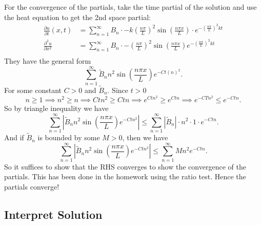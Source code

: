 \documentclass[class=article,crop=false]{standalone}
\begin{document}
For the convergence of the partials, take the time partial of the solution and use the heat equation to get the 2nd space partial:
\begin{align*}
	\frac{\partial u}{\partial t} (x,t) &= \sum_{ n= 1}^{\infty} B_n \cdot -k \left( \frac{n \pi }{L} \right)^2 \sin \left( \frac{ n\pi x}{ L} \right) \cdot  e^{-( \frac{ n\pi}{L} )^2 kt}   \\
	\frac{\partial^2 u}{\partial { x}^2} &= \sum_{ n= 1}^{\infty} B_n \cdot -\left( \frac{n \pi}{L} \right)^2 \sin \left( \frac{ n\pi x}{ L} \right) e^{-( \frac{ n\pi}{L} )^2 kt}   \\
\end{align*}
They have the general form
\[
	\sum_{ n= 1}^{\infty} \tilde{B}_n n^2 \sin \left( \frac{ n\pi x}{ L} \right) e^{-C t( n )^2 } 
.\]
For some constant $ C>0$ and $ \tilde{ B}_n$. Since  $ t>0$
 \[
n\geq 1 \implies n^2 \geq n \implies Ctn^2 \geq Ct n \implies e^{Ctn^2} \geq e^{Ctn} \implies e^{-CTn^2} \leq e^{-Ctn}
.\] 
So by triangle inequality we have
\[
\sum_{ n= 1}^{\infty} \left| \tilde{ B}_n n^2 \sin \left( \frac{ n\pi x}{ L} \right) e^{-Ctn^2}  \right| \leq \sum_{ n= 1}^{\infty} |\tilde{ B}_n | \cdot  n^2 \cdot 1 \cdot  e^{-Ctn}
.\] 
And if $ \tilde{ B}_n $ is bounded by some $ M>0$, then we have
 \[
\sum_{ n= 1}^{\infty} \left| \tilde{ B}_n n^2 \sin \left( \frac{ n\pi x}{ L} \right) e^{-Ctn^2}  \right| \leq \sum_{ n= 1}^{\infty} Mn^2 e^{-Ctn}
.\] 
So it suffices to show that the RHS converges to show the convergence of the partials. This has been done in the homework using the ratio test. Hence the partials converge! 

\subsection{Interpret Solution}
\end{document}
